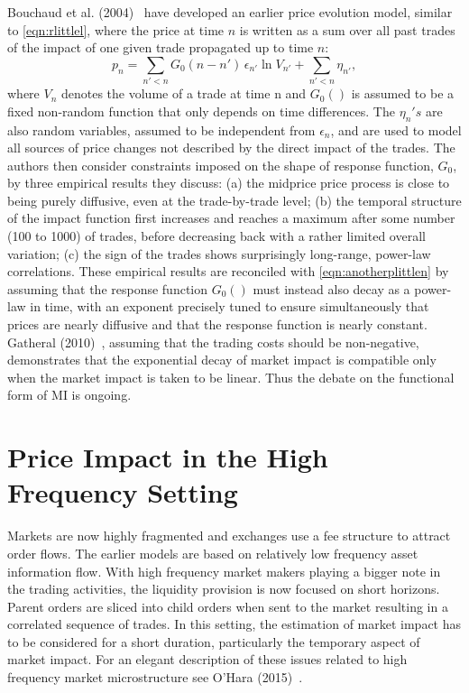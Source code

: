 Bouchaud et al. (2004)~\cite{bouchaud2004} have developed an earlier price evolution model, similar to \eqref{eqn:rlittlel}, where the price at time $n$ is written as a sum over all past trades of the impact of one given trade propagated up to time $n$:
	\begin{equation} \label{eqn:anotherplittlen}
	p_n = \sum_{n'<n} G_0(n - n')\,\epsilon_{n'} \ln{V_{n'}} + \sum_{n'<n} \eta_{n'},
	\end{equation}
where $V_n$ denotes the volume of a trade at time n and $G_0()$ is assumed to be a fixed non-random function that only depends on time differences. The $\eta_n's$ are also random variables, assumed to be independent from $\epsilon_n$, and are used to model all sources of price changes not described by the direct impact of the trades. The authors then consider constraints imposed on the shape of response function, $G_0$, by three empirical results they discuss: (a) the midprice price process is close to being purely diffusive, even at the trade-by-trade level; (b) the temporal structure of the impact function first increases and reaches a maximum after some number (100 to 1000) of trades, before decreasing back with a rather limited overall variation; (c) the sign of the trades shows surprisingly long-range, power-law correlations. These empirical results are reconciled with \eqref{eqn:anotherplittlen} by assuming that the response function $G_0()$ must instead also decay as a power-law in time, with an exponent precisely tuned to ensure simultaneously that prices are nearly diffusive and that the response function is nearly constant. Gatheral (2010)~\cite{gatheral}, assuming that the trading costs should be non-negative, demonstrates that the exponential decay of market impact is compatible only when the market impact is taken to be linear. Thus the debate on the functional form of MI is ongoing. \label{in:style10}



\section{Price Impact in the High Frequency Setting\label{sec:price_impact_hfs}}

Markets are now highly fragmented and exchanges use a fee structure to attract order flows. The earlier models are based on relatively low frequency asset information flow. With high frequency market makers playing a bigger note in the trading activities, the liquidity provision is now focused on short horizons. Parent orders are sliced into child orders when sent to the market resulting in a correlated sequence of trades. In this setting, the estimation of market impact has to be considered for a short duration, particularly the temporary aspect of market impact. For an elegant description of these issues related to high frequency market microstructure see O'Hara (2015)~\cite{ohara15hfmm}.


